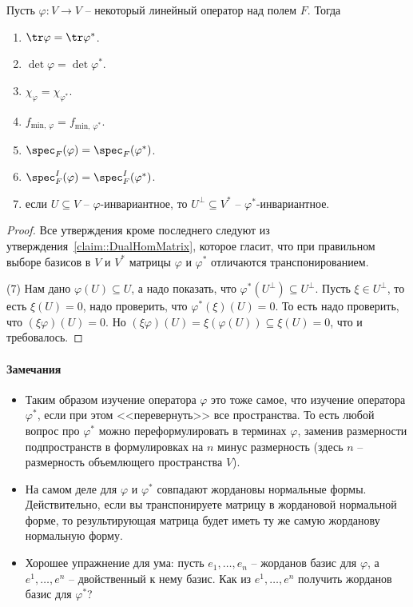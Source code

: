 \begin{claim}
Пусть $\varphi\colon V\to V$ -- некоторый линейный оператор над полем $F$.
Тогда
\begin{enumerate}
\item $\tr \varphi = \tr \varphi^*$.

\item $\det \varphi = \det \varphi^*$.

\item $\chi_\varphi = \chi_{\varphi^*}$.

\item $f_{\text{min},\,\varphi} = f_{\text{min},\,\varphi^*}$.

\item $\spec_F(\varphi) = \spec_F(\varphi^*)$.

\item $\spec_F^I(\varphi) = \spec_F^I(\varphi^*)$.

\item если $U\subseteq V$ -- $\varphi$-инвариантное, то $U^\bot\subseteq V^*$ -- $\varphi^*$-инвариантное.
\end{enumerate}
\end{claim}
\begin{proof}
Все утверждения кроме последнего следуют из утверждения~\ref{claim::DualHomMatrix}, которое гласит, что при правильном выборе базисов в $V$ и $V^*$ матрицы $\varphi$ и $\varphi^*$ отличаются транспонированием.

(7) Нам дано $\varphi(U)\subseteq U$, а надо показать, что $\varphi^*(U^\bot)\subseteq U^\bot$.
Пусть $\xi\in U^\bot$, то есть $\xi(U) = 0$, надо проверить, что $\varphi^*(\xi)(U) = 0$.
То есть надо проверить, что $(\xi \varphi)(U) = 0$.
Но $(\xi \varphi) (U) = \xi(\varphi(U))\subseteq \xi(U) = 0$, что и требовалось.
\end{proof}

\paragraph{Замечания}
\begin{itemize}
\item Таким образом изучение оператора $\varphi$ это тоже самое, что изучение оператора $\varphi^*$, если при этом <<перевернуть>> все пространства.
То есть любой вопрос про $\varphi^*$ можно переформулировать в терминах $\varphi$, заменив размерности подпространств в формулировках на $n$ минус размерность (здесь $n$ -- размерность объемлющего пространства $V$).

\item На самом деле для $\varphi$ и $\varphi^*$ совпадают жордановы нормальные формы.
Действительно, если вы транспонируете матрицу в жордановой нормальной форме, то результирующая матрица будет иметь ту же самую жорданову нормальную форму.

\item Хорошее упражнение для ума: пусть $e_1,\ldots,e_n$ -- жорданов базис для $\varphi$, а $e^1,\ldots,e^n$ -- двойственный к нему базис.
Как из $e^1,\ldots,e^n$ получить жорданов базис для $\varphi^*$?
\end{itemize}

